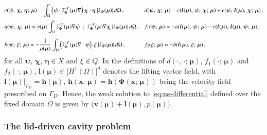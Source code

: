\documentclass[longtitle]{elsarticle}
\numberwithin{equation}{section}
\theoremstyle{theorem}
\theoremstyle{definition}
\theoremstyle{remark}
\theoremstyle{proposition}
\numberwithin{figure}{section}
\newcommand{\wt}[1]{\widetilde{#1}}
\newcommand{\bg}[1]{\boldsymbol{#1}}
\begin{document}
		\begin{equation*}
			\label{eq:ns-weak-forms}
			\begin{aligned}
				& c(\bg{\psi}, \, \bg{\chi}, \, \bg{\eta}; \, \bg{\mu}) = \int_{\Omega} \left( \bg{\psi} \cdot \mathbb{J}^{-T}_{\bg{\Phi}}(\bg{\mu}) \nabla \right) \bg{\chi} \cdot \bg{\eta} ~ \lvert \mathbb{J}_{\bg{\Phi}}(\bg{\mu}) \rvert \, d \Omega \, , \qquad && d(\bg{\psi}, \, \bg{\chi}; \, \bg{\mu}) = c(\bg{l}(\bg{\mu}), \, \bg{\psi}, \, \bg{\chi}; \, \bg{\mu}) + c(\bg{\psi}, \, \bg{l}(\bg{\mu}), \, \bg{\chi}; \, \bg{\mu}) \, , \\[0.1cm]
				& a(\bg{\psi}, \, \bg{\chi}; \, \bg{\mu}) = \nu(\bg{\mu}) \int_{\Omega} \mathbb{J}^{-T}_{\bg{\Phi}}(\bg{\mu}) \nabla \bg{\psi} ~ : ~ \mathbb{J}^{-T}_{\bg{\Phi}}(\bg{\mu}) \nabla \bg{\chi} ~ \lvert \mathbb{J}_{\bg{\Phi}}(\bg{\mu}) \rvert \, d \Omega \, , && f_1(\bg{\psi}; \, \bg{\mu}) = - a(\bg{l}(\bg{\mu}), \, \bg{\psi}; \, \bg{\mu}) - c(\bg{l}(\bg{\mu}), \, \bg{l}(\bg{\mu}), \, \bg{\psi}; \, \bg{\mu}) \, , \\[0.2cm]
				& b(\bg{\psi}, \, \xi; \, \bg{\mu}) = - \dfrac{1}{\rho(\bg{\mu})} \int_{\Omega} \left( \mathbb{J}^{-T}_{\bg{\Phi}}(\bg{\mu}) \nabla \cdot \bg{\psi} \right) ~ \xi ~ \lvert \mathbb{J}_{\bg{\Phi}}(\bg{\mu}) \rvert \, d \Omega \, , && f_2(\xi; \, \bg{\mu}) = - b(\bg{l}(\bg{\mu}), \, \xi; \, \bg{\mu}) \, ,
			\end{aligned}
			\vspace*{-0.1cm}
		\end{equation*}
		for all $\bg{\psi}$, $\bg{\chi}$, $\bg{\eta} \in X$ and $\xi \in Q$. In the definitions of $d(\cdot, \, \cdot; \, \bg{\mu})$, $f_1(\cdot; \, \bg{\mu})$ and $f_2(\cdot; \, \bg{\mu})$, $\bg{l}(\bg{\mu}) \in \big[ H^1(\Omega) \big]^d$ denotes the lifting vector field, with $\bg{l}(\bg{\mu}) \big\rvert_{\Gamma_D} = \bg{h}(\bg{\mu})$, $\bg{h}(\bg{x}; \, \bg{\mu}) = \wt{\bg{h}}(\bg{\Phi}(\bg{x}; \, \bg{\mu}))$ being the velocity field prescribed on $\Gamma_D$. Hence, the weak solution to \eqref{eq:ns-differential} defined over the fixed domain $\Omega$ is given by $\big( \bg{v}(\bg{\mu}) + \bg{l}(\bg{\mu}), p(\bg{\mu}) \big)$.
	
	
	
	\subsubsection{The lid-driven cavity problem}
	\label{section:The lid-driven cavity problem}
		
\end{document}
